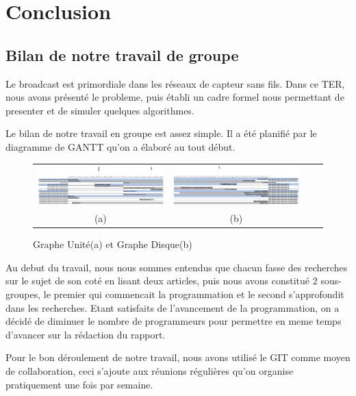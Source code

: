 \chapter{Conclusion}\label{conclusion}

\section{Bilan de notre travail de groupe}
Le broadcast est primordiale dans les réseaux de capteur sans fils. Dans ce TER, nous avons présenté le probleme, puis établi un cadre 
formel nous permettant de presenter et de simuler quelques algorithmes. 



Le bilan de notre travail en groupe est assez simple. Il a été planifié par le diagramme de GANTT qu'on a élaboré au tout début.

\begin{figure}[tb]
    \centering
    \begin{tabular}{cccc}
      
      \includegraphics[angle=90, scale= 0.5,width=.5\linewidth]{Conclusion/diagramme} &
      \includegraphics[angle=90, scale= 0.5,width=.5\linewidth]{Conclusion/diagramme2} 
   \\
      (a) & (b) \\
    \end{tabular}
    \caption{Graphe Unité(a) et Graphe Disque(b) \label{Unit}}
\end{figure}

Au debut du travail, nous nous sommes entendus que chacun fasse des recherches sur le sujet de son coté en lisant 
deux articles, puis nous avons constitué 2 sous-groupes, le premier qui commencait la programmation et le second 
s'approfondit dans les recherches. Etant satisfaits de l'avancement de la programmation, on a décidé de diminuer 
le nombre de programmeurs pour permettre en meme temps d'avancer sur la rédaction du rapport.

Pour le bon déroulement de notre travail, nous avons utilisé le GIT comme moyen de collaboration, ceci s'ajoute 
aux réunions régulières qu'on organise pratiquement une fois par semaine.

